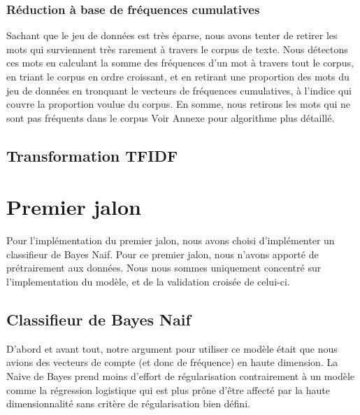\documentclass{article}
\begin{document}
\subsubsection{Réduction à base de fréquences cumulatives}
Sachant que le jeu de données est très éparse,  nous avons tenter de retirer les mots qui surviennent très rarement à travers le corpus de texte. Nous détectons ces mots en calculant la somme des fréquences d'un mot à travers tout le corpus, en triant le corpus en ordre croissant, et en retirant une proportion des mots du jeu de données en tronquant le vecteurs de fréquences cumulatives, à l'indice qui couvre la proportion voulue du corpus. En somme, nous retirons les mots qui ne sont pas fréquents dans le corpus Voir Annexe pour algorithme plus détaillé. 
\subsection{Transformation TFIDF}

\section{Premier jalon}
Pour l'implémentation du premier jalon, nous avons choisi d'implémenter un classifieur de Bayes Naif. Pour ce premier jalon, nous n'avons apporté de prétrairement aux données. Nous nous sommes uniquement concentré sur l'implementation du modèle, et de la validation croisée de celui-ci.

\subsection{Classifieur de Bayes Naif}
D'abord et avant tout, notre argument pour utiliser ce modèle était que nous avions des vecteurs de compte (et donc de fréquence) en haute dimension. La Naive de Bayes prend moins d'effort de régularisation contrairement à un modèle comme la régression logistique qui est plus prône d'être affecté par la haute dimensionnalité sans critère de régularisation bien défini.
\end{document}
